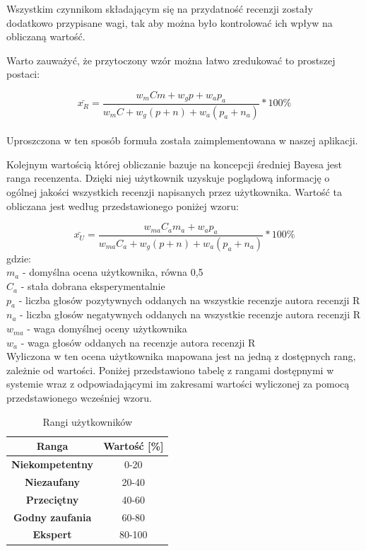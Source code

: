 Wszystkim czynnikom składającym się na przydatność recenzji zostały dodatkowo przypisane wagi, tak aby można było kontrolować ich wpływ na obliczaną wartość.

Warto zauważyć, że przytoczony wzór można łatwo zredukować to prostszej postaci:

\begin{equation}
\bar{x_{R}}=\frac{w_{m}Cm+w_{g}{p}+w_{a}p_{a}}{w_{m}C+w_{g}(p+n)+w_{a}(p_{a}+n_{a})}*100\%
\end{equation}\\

Uproszczona w ten sposób formuła została zaimplementowana w naszej aplikacji.

Kolejnym wartością której obliczanie bazuje na koncepcji średniej Bayesa jest ranga recenzenta. Dzięki niej użytkownik uzyskuje poglądową informację o ogólnej jakości wszystkich recenzji napisanych przez użytkownika. Wartość ta obliczana jest według przedstawionego poniżej wzoru:

\begin{equation}
\bar{x_{U}}=\frac{w_{ma}C_{a}m_{a}+w_{a}p_{a}}{w_{ma}C_{a}+w_{g}(p+n)+w_{a}(p_{a}+n_{a})}*100\%
\end{equation}
gdzie:\\
$m_{a}$ - domyślna ocena użytkownika, równa 0,5\\
$C_{a}$ - stała dobrana eksperymentalnie\\
$p_{a}$ - liczba głosów pozytywnych oddanych na wszystkie recenzje autora recenzji R\\
$n_{a}$ - liczba głosów negatywnych oddanych na wszystkie recenzje autora recenzji R\\
$w_{ma}$ - waga domyślnej oceny użytkownika\\
$w_{a}$ - waga głosów oddanych na recenzje autora recenzji R\\

Wyliczona w ten ocena użytkownika mapowana jest na jedną z dostępnych rang, zależnie od wartości. Poniżej przedstawiono tabelę z rangami dostępnymi w systemie wraz z odpowiadającymi im zakresami wartości wyliczonej za pomocą przedstawionego wcześniej wzoru.

\begin{table}[!h]
\centering
\begin{tabular}{|c||c|}  
\hline
\textbf{Ranga} & \textbf{Wartość [\%]} \\
\hline\hline
\textbf{Niekompetentny} & 0-20 \\  
\hline
\textbf{Niezaufany} & 20-40 \\  
\hline
\textbf{Przeciętny} & 40-60 \\  
\hline
\textbf{Godny zaufania} & 60-80 \\  
\hline
\textbf{Ekspert} & 80-100 \\  
\hline
\end{tabular}
\caption{Rangi użytkowników}
\end{table}





